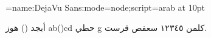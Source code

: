 


\font\test={name:DejaVu Sans:mode=node;script=arab} at 10pt

\test
أبجد () هوز ab()cd حطي g كلمن ١٢٣٤٥ سعفص قرست.
\bye
